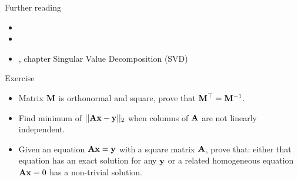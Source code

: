 \documentclass{beamer}
\begin{document}
\begin{frame}{Further reading}
	\begin{flushleft}
		
		\begin{itemize}
			\item {}
			
			\item {}
			
			\item {}, chapter Singular Value Decomposition (SVD)
			
		\end{itemize}
		
		
	\end{flushleft}
\end{frame}




\begin{frame}{Exercise}
	\begin{flushleft}
		
		\begin{itemize}
			\item Matrix $\mathbf{M}$ is orthonormal and square, prove that $\mathbf{M}^\top = \mathbf{M}^{-1}$.
			
			\item Find minimum of $||\mathbf{A}\mathbf{x} - \mathbf{y}||_2$ when columns of $\mathbf{A}$ are not linearly independent.
			
			\item Given an equation $\mathbf{A}\mathbf{x} = \mathbf{y}$ with a square matrix $\mathbf{A}$, prove that: either that equation has an exact solution for any $\mathbf{y}$ or a related homogeneous equation $\mathbf{A}\mathbf{x} = 0$ has a non-trivial solution.
		\end{itemize}
		
		
		
	\end{flushleft}
\end{frame}
\end{document}
